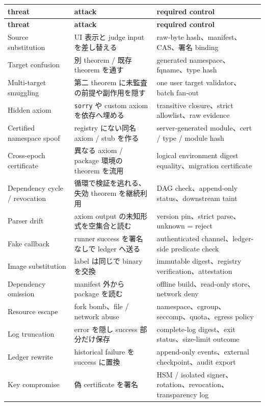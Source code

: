 \documentclass[a4paper,11pt]{ltjsarticle}
\newcommand{\code}[1]{\texttt{#1}}
\begin{document}
\begin{longtable}{L{39mm}L{51mm}L{53mm}}
\toprule
\textbf{threat} & \textbf{attack} & \textbf{required control} \\
\midrule
\endfirsthead
\toprule
\textbf{threat} & \textbf{attack} & \textbf{required control} \\
\midrule
\endhead
Source substitution & UI 表示と judge input を差し替える & raw-byte hash、manifest、CAS、署名 binding \\
Target confusion & 別 theorem / 既存 theorem を通す & generated namespace、fqname、type hash \\
Multi-target smuggling & 第二 theorem に未監査の前提や副作用を隠す & one user target validator、batch fan-out \\
Hidden axiom & \code{sorry} や custom axiom を依存へ埋める & transitive closure、strict allowlist、raw evidence \\
Certified namespace spoof & registry にない同名 axiom / stub を作る & server-generated module、cert / type / module hash \\
Cross-epoch certificate & 異なる axiom / package 環境の theorem を流用 & logical environment digest equality、migration certificate \\
Dependency cycle / revocation & 循環で検証を逃れる、失効 theorem を継続利用 & DAG check、append-only status、downstream taint \\
Parser drift & axiom output の未知形式を空集合と読む & version pin、strict parse、unknown = reject \\
Fake callback & runner success を署名なしで ledger へ送る & authenticated channel、ledger-side predicate check \\
Image substitution & label は同じで binary を交換 & immutable digest、registry verification、attestation \\
Dependency omission & manifest 外から package を読む & offline build、read-only store、network deny \\
Resource escape & fork bomb、file / network abuse & namespace、cgroup、seccomp、quota、egress policy \\
Log truncation & error を隠し success 部分だけ保存 & complete-log digest、exit status、size-limit outcome \\
Ledger rewrite & historical failure を success に置換 & append-only events、external checkpoint、audit export \\
Key compromise & 偽 certificate を署名 & HSM / isolated signer、rotation、revocation、transparency log \\
\bottomrule
\end{longtable}
\end{document}
